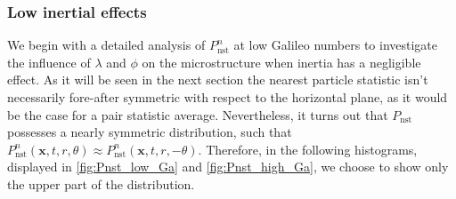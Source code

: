 \subsubsection*{Low inertial effects }
We begin with a detailed analysis of $P_\text{nst}^n$ at low Galileo numbers to investigate the influence of $\lambda$ and $\phi$ on the microstructure when inertia has a negligible effect.
As it will be seen in the next section the nearest particle statistic isn't necessarily fore-after symmetric with respect to the horizontal plane, as it would be the case for a pair statistic average. 
Nevertheless, it turns out that $P_\text{nst}$ possesses a nearly symmetric distribution, such that $P_\text{nst}^n(\textbf{x},t,r,\theta)\approx P_\text{nst}^n(\textbf{x},t,r,- \theta)$. 
Therefore, in the following histograms, displayed in \ref{fig:Pnst_low_Ga} and \ref{fig:Pnst_high_Ga}, we choose to show only the upper part of the distribution.

